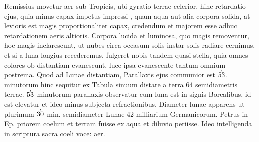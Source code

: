  \pstart [93 v\textsuperscript{o}]  Remissius  movetur aer sub Tropicis, ubi gyratio terrae\protect{} celerior, hinc retardatio ejus,  quia minus capax impetus\protect{} impressi , quam  aqua aut alia corpora solida, at levioris est magis proportionaliter capax,  credendum et majorem esse adhuc retardationem aeris altioris.
 \pend 
 \pstart 
  Corpora lucida  et luminosa, quo magis removentur,  hoc magis inclarescunt, ut nubes circa  occasum solis\protect{} instar solis\protect{} radiare cernimus,  et si a luna\protect{} longius recederemus, fulgeret  nobis tandem quasi stella, quia omnes colores  ob distantiam evanescunt, luce\protect{} ipsa  evanescente tantum omnium postrema.
 \pend 
 \pstart 
  Quod ad Lunae\protect{}  distantiam, Parallaxis\protect{} ejus communior est $53\hspace{-6pt}\raisebox{9pt}{,}\protect\hspace{4pt}$.  minutorum hinc sequitur ex Tabula sinuum  distare a terra\protect{} 64 semidiametris terrae\protect{}.  $53\hspace{-6pt}\raisebox{9pt}{,}\protect\hspace{4pt}$ minutorum parallaxis\protect{} observatur cum luna\protect{} est in signis Borealibus,  id est elevatur et ideo minus subjecta refractionibus\protect{}. Diameter lunae\protect{} apparens ut plurimum $30\hspace{-6pt}\raisebox{9pt}{,}\protect\hspace{4pt}$ min. semidiameter Lunae\protect{} 42 milliarium Germanicorum.
 \pend 
 \pstart 
  Petrus\protect{} in Ep.  priorem coelum et terram\protect{} fuisse ex aqua  et diluvio periisse. Ideo intelligenda in  scriptura sacra coeli voce: aer.
